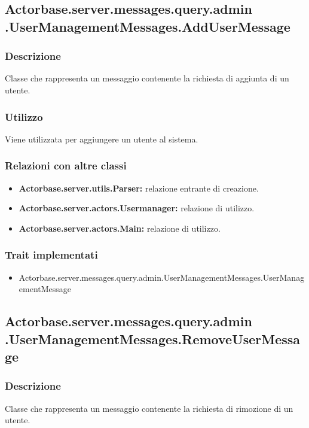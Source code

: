 \documentclass[a4paper]{article}
\begin{document}
		\subsection{Actorbase.server.messages.query.admin \newline
		.UserManagementMessages.AddUserMessage}
			\subsubsection{Descrizione}
				Classe che rappresenta un messaggio contenente la richiesta di aggiunta di un utente.
				
			\subsubsection{Utilizzo}
				Viene utilizzata per aggiungere un utente al sistema.
				
			\subsubsection{Relazioni con altre classi}
				\begin{itemize}
					\item \textbf{Actorbase.server.utils.Parser:} relazione entrante di creazione.
					\item \textbf{Actorbase.server.actors.Usermanager:} relazione di utilizzo.
					\item \textbf{Actorbase.server.actors.Main:} relazione di utilizzo.
				\end{itemize}
			\subsubsection{Trait implementati}
				\begin{itemize}
					\item Actorbase.server.messages.query.admin.UserManagementMessages.UserManagementMessage
				\end{itemize}
		
		\subsection{Actorbase.server.messages.query.admin \newline
		.UserManagementMessages.RemoveUserMessage}
			\subsubsection{Descrizione}
				Classe che rappresenta un messaggio contenente la richiesta di rimozione di un utente.
				
\end{document}
